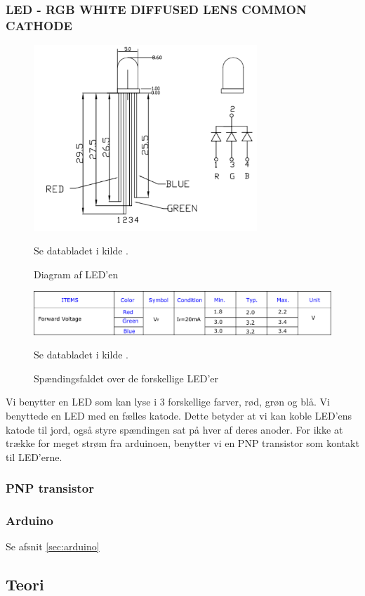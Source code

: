 \subsubsection{LED - RGB WHITE DIFFUSED LENS COMMON CATHODE}
\begin{figure}[H]
	\centering
    \includegraphics[height=7cm]{figures/komponenter/LED2}
	\caption{Diagram af LED'en}
	Se databladet i kilde \cite{kompRGBLED}.
\end{figure}
\begin{figure}[H]
	\centering
    \includegraphics[width=\textwidth]{figures/komponenter/LED}
	\caption{Spændingsfaldet over de forskellige LED'er}
	Se databladet i kilde \cite{kompRGBLED}.
\end{figure}
Vi benytter en LED som kan lyse i 3 forskellige farver, rød, grøn og blå. Vi benyttede en LED med en fælles katode. Dette betyder at vi kan koble LED'ens katode til jord, også styre spændingen sat på hver af deres anoder. For ikke at trække for meget strøm fra arduinoen, benytter vi en PNP transistor som kontakt til LED'erne.

\subsubsection{PNP transistor}

\subsubsection{Arduino}
Se afsnit \ref{sec:arduino} 

\subsection{Teori}

